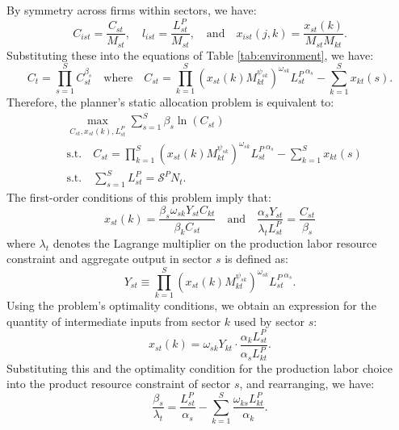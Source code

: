 \documentclass[12pt]{article}
\begin{document}
By symmetry across firms within sectors, we have:
\begin{equation*}
    C_{ist} = \frac{C_{st}}{M_{st}}, \quad l_{ist} = \frac{L_{st}^P}{M_{st}}, \quad \text{and} \quad x_{ist}(j, k) = \frac{x_{st}(k)}{M_{st} M_{kt}}.
\end{equation*}
Substituting these into the equations of Table \ref{tab:environment}, we have:
\begin{equation*}
    C_t = \prod_{s = 1}^S C_{st}^{\beta_s} \quad \text{where} \quad C_{st} = \prod_{k = 1}^S \left(x_{st}(k) M_{kt}^{\psi_{sk}}\right)^{\omega_{sk}} {L_{st}^P}^{\alpha_s} - \sum_{k = 1}^S x_{kt}(s).
\end{equation*}
Therefore, the planner's static allocation problem is equivalent to:
\begin{align*}
    &\max_{C_{st}, x_{st}(k), L_{st}^P} \sum_{s = 1}^S \beta_s \ln(C_{st}) \\
    &\text{s.t.} \quad C_{st} = \prod_{k = 1}^S \left(x_{st}(k) M_{kt}^{\psi_{sk}}\right)^{\omega_{sk}} {L_{st}^P}^{\alpha_s} - \sum_{k = 1}^S x_{kt}(s) \\
    &\text{s.t.} \quad \sum_{s = 1}^S L_{st}^P = \mathcal{S}^P N_t.
\end{align*}
The first-order conditions of this problem imply that:
\begin{equation*}
    x_{st}(k) = \frac{\beta_s \omega_{sk} Y_{st} C_{kt}}{\beta_k C_{st}} \quad \text{and} \quad \frac{\alpha_s Y_{st}}{\lambda_t L_{st}^P} = \frac{C_{st}}{\beta_s}
\end{equation*}
where $\lambda_t$ denotes the Lagrange multiplier on the production labor resource constraint and aggregate output in sector $s$ is defined as:
\begin{equation}
    Y_{st} \equiv \prod_{k = 1}^S \left(x_{st}(k) M_{kt}^{\psi_{sk}}\right)^{\omega_{sk}} {L_{st}^P}^{\alpha_s}. \label{eq:aggregate output}
\end{equation}
Using the problem's optimality conditions, we obtain an expression for the quantity of intermediate inputs from sector $k$ used by sector $s$:
\begin{equation}
    x_{st}(k) = \omega_{sk} Y_{kt} \cdot \frac{\alpha_k L_{st}^P}{\alpha_s L_{kt}^P}. \label{eq:intermediate inputs}
\end{equation}
Substituting this and the optimality condition for the production labor choice into the product resource constraint of sector $s$, and rearranging, we have:
\begin{equation*}
    \frac{\beta_s}{\lambda_t} = \frac{L_{st}^P}{\alpha_s} - \sum_{k = 1}^S \frac{\omega_{ks} L_{kt}^P}{\alpha_k}.
\end{equation*}
\end{document}
